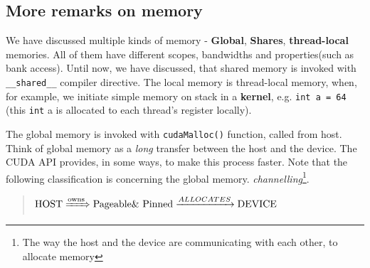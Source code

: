 \documentclass[12pt]{article}
\begin{document}

\subsection{More remarks on memory}
We have discussed multiple kinds of memory - \textbf{Global}, \textbf{Shares}, 
\textbf{thread-local} memories. All of them have different scopes, 
bandwidths and properties(such as bank access).
Until now, we have discussed, that shared memory is invoked with \verb|__shared__| compiler 
directive. The local memory is thread-local memory, when, for example, we initiate simple memory 
on stack in a \textbf{kernel}, e.g. \verb|int a = 64| (this \verb|int| a is allocated to each thread's
register locally). 

The global memory is invoked with \verb|cudaMalloc()| function, called from host. Think of 
global memory as a \textit{long} transfer between the host and the device. 
The CUDA API provides, in some ways, to make this process faster. Note that the following classification is 
concerning the global memory. \textit{channelling}\footnote{The way the host and the device are 
communicating with each other, to allocate memory}.

\begin{quote}
   $\text{HOST}\xRightarrow{\text{owns}}\text{Pageable\& Pinned} \xrightarrow{ALLOCATES}\text{DEVICE}$
   \label{quote:pinned_pageable}
\end{quote}
\end{document}
